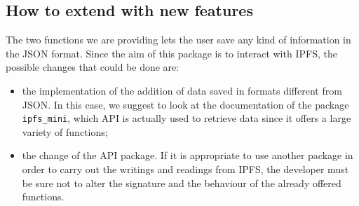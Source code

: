 \subsection{How to extend with new features}
The two functions we are providing lets the user save any kind of information in the JSON format. Since the aim of this package is to interact with IPFS, the possible changes that could be done are:
\begin{itemize}
	\item the implementation of the addition of data saved in formats different from JSON. In this case, we suggest to look at the documentation of the package \texttt{ipfs\_mini}, which API is actually used to retrieve data since it offers a large variety of functions;
	\item the change of the API package. If it is appropriate to use another package in order to carry out the writings and readings from IPFS, the developer must be sure not to alter the signature and the behaviour of the already offered functions.
\end{itemize}